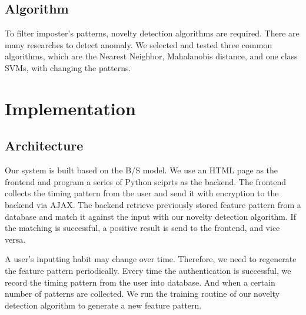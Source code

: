 \documentclass[twocolumn,showpacs,%
  nofootinbib,aps,%
  eqsecnum,prd,notitlepage,showkeys,10pt]{revtex4-1}
\begin{document}
\subsection{Algorithm}
To filter imposter's patterns, novelty detection algorithms are required. There are many researches to detect anomaly\cite{banerjee2012biometric}. We selected and tested three common algorithms, which are the Nearest Neighbor, Mahalanobis distance, and one class SVMs, with changing the patterns.

\section{Implementation}
\subsection{Architecture}
Our system is built based on the B/S model. We use an HTML page as the frontend and program a series of Python sciprts as the backend. The frontend collects the timing pattern from the user and send it with encryption to the backend via AJAX. The backend retrieve previously stored feature pattern from a database and match it against the input with our novelty detection algorithm. If the matching is successful, a positive result is send to the frontend, and vice versa.
\par
A user's inputting habit may change over time. Therefore, we need to regenerate the feature pattern periodically. Every time the authentication is successful, we record the timing pattern from the user into database. And when a certain number of patterns are collected. We run the training routine of our novelty detection algorithm to generate a new feature pattern.
\end{document}
